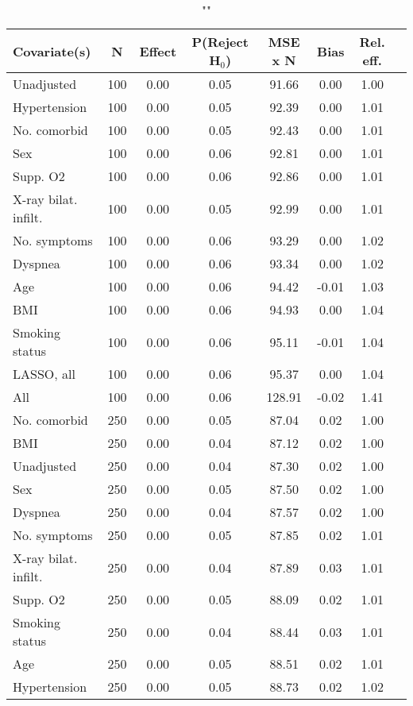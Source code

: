 \documentclass{article}
\begin{document}
{\tabcolsep=6pt  %
\begin{longtable}{lccccccc}
\caption{""} \\
Covariate(s) & N & Effect & P(Reject H$_0$) & MSE x N & Bias & Rel. eff.\\ \midrule
Unadjusted & 100 & 0.00 & 0.05 &  91.66 &  0.00 & 1.00 \\ 
Hypertension & 100 & 0.00 & 0.05 &  92.39 &  0.00 & 1.01 \\ 
No. comorbid & 100 & 0.00 & 0.05 &  92.43 &  0.00 & 1.01 \\ 
Sex & 100 & 0.00 & 0.06 &  92.81 &  0.00 & 1.01 \\ 
Supp. O2 & 100 & 0.00 & 0.06 &  92.86 &  0.00 & 1.01 \\ 
X-ray bilat. infilt. & 100 & 0.00 & 0.05 &  92.99 &  0.00 & 1.01 \\ 
No. symptoms & 100 & 0.00 & 0.06 &  93.29 &  0.00 & 1.02 \\ 
Dyspnea & 100 & 0.00 & 0.06 &  93.34 &  0.00 & 1.02 \\ 
Age & 100 & 0.00 & 0.06 &  94.42 & -0.01 & 1.03 \\ 
BMI & 100 & 0.00 & 0.06 &  94.93 &  0.00 & 1.04 \\ 
Smoking status & 100 & 0.00 & 0.06 &  95.11 & -0.01 & 1.04 \\ 
LASSO, all & 100 & 0.00 & 0.06 &  95.37 &  0.00 & 1.04 \\ 
All & 100 & 0.00 & 0.06 & 128.91 & -0.02 & 1.41 \\ \midrule 
No. comorbid & 250 & 0.00 & 0.05 &  87.04 &  0.02 & 1.00 \\ 
BMI & 250 & 0.00 & 0.04 &  87.12 &  0.02 & 1.00 \\ 
Unadjusted & 250 & 0.00 & 0.04 &  87.30 &  0.02 & 1.00 \\ 
Sex & 250 & 0.00 & 0.05 &  87.50 &  0.02 & 1.00 \\ 
Dyspnea & 250 & 0.00 & 0.04 &  87.57 &  0.02 & 1.00 \\ 
No. symptoms & 250 & 0.00 & 0.05 &  87.85 &  0.02 & 1.01 \\ 
X-ray bilat. infilt. & 250 & 0.00 & 0.04 &  87.89 &  0.03 & 1.01 \\ 
Supp. O2 & 250 & 0.00 & 0.05 &  88.09 &  0.02 & 1.01 \\ 
Smoking status & 250 & 0.00 & 0.04 &  88.44 &  0.03 & 1.01 \\ 
Age & 250 & 0.00 & 0.05 &  88.51 &  0.02 & 1.01 \\ 
Hypertension & 250 & 0.00 & 0.05 &  88.73 &  0.02 & 1.02 \\ 

\end{longtable}}
\end{document}
